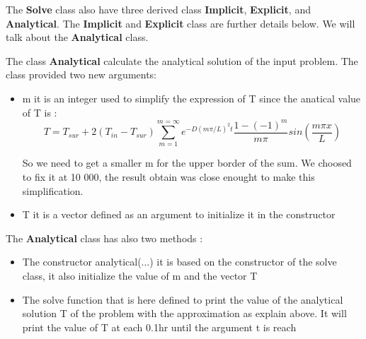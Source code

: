\documentclass [10 pt, a4 paper]{article}
\begin{document}
\vspace{0.3cm}
The \textbf{Solve} class also have three derived class \textbf{Implicit}, \textbf{Explicit}, and \textbf{Analytical}.
The \textbf{Implicit} and \textbf{Explicit} class are further details below. We will talk about the \textbf{Analytical} class.
\vspace{0.3cm}

The class \textbf{Analytical} calculate the analytical solution of the input problem.
The class provided two new arguments:
\begin{itemize}
    \item m it is an integer used to simplify the expression of T since the anatical value of T is : 
    \begin{equation}
        T = T_{sur} + 2(T_{in}-T_{sur}) \sum_{m=1}^{m=\infty} e^{-D(m\pi /L)^{2}t} \frac{1-(-1)^{m}}{m\pi} sin(\frac{m\pi x}{L})
    \end{equation}

    So we need to get a smaller m for the upper border of the sum. We choosed to fix it at 10 000, 
    the result obtain was close enought to make this simplification.

    \item T it is a vector defined as an argument to initialize it in the constructor
\end{itemize}
The \textbf{Analytical} class has also two methods :
\begin{itemize}
    \item The constructor analytical(...) it is based on the constructor of the solve class, it also
    initialize the value of m and the vector T
    \item The solve function that is here defined to print the value of the analytical solution T 
    of the problem with the approximation as explain above. It will print the value of T at each 0.1hr
    until the argument t is reach
\end{itemize}

\vspace{0.3cm}
\end{document}
